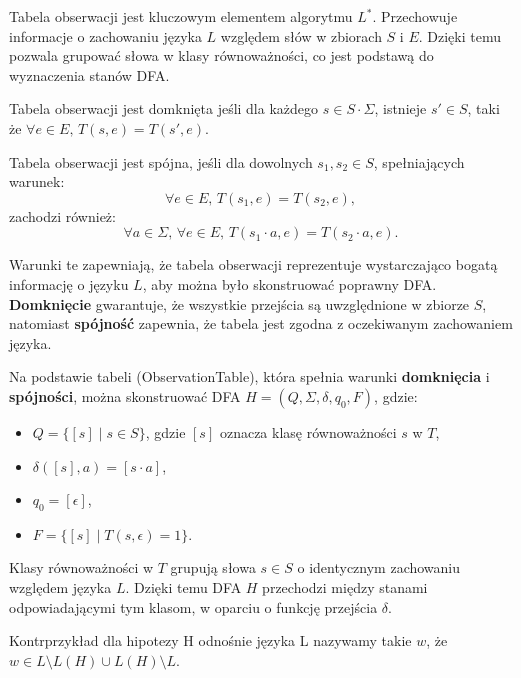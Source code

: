 Tabela obserwacji jest kluczowym elementem algorytmu \( L^* \). Przechowuje informacje o zachowaniu języka \( L \) względem słów w zbiorach \( S \) i \( E \). Dzięki temu pozwala grupować słowa w klasy równoważności, co jest podstawą do wyznaczenia stanów DFA.

\begin{definition}[Domknięcie] 
    Tabela obserwacji jest domknięta jeśli dla każdego \( s \in S \cdot \Sigma \), istnieje \( s' \in S \), taki że \( \forall e \in E, \, T(s, e) = T(s', e) \).
\end{definition}
\begin{definition}[Spójność]
    Tabela obserwacji jest spójna, jeśli dla dowolnych \( s_1, s_2 \in S \), spełniających warunek:
    \[
    \forall e \in E, \, T(s_1, e) = T(s_2, e),
    \]
    zachodzi również:
    \[
    \forall a \in \Sigma, \, \forall e \in E, \, T(s_1 \cdot a, e) = T(s_2 \cdot a, e).
    \]
\end{definition}

Warunki te zapewniają, że tabela obserwacji reprezentuje wystarczająco bogatą informację o języku \( L \), aby można było skonstruować poprawny DFA. \textbf{Domknięcie} gwarantuje, że wszystkie przejścia są uwzględnione w zbiorze \( S \), natomiast \textbf{spójność} zapewnia, że tabela jest zgodna z oczekiwanym zachowaniem języka.

\begin{definition}
    Na podstawie tabeli (ObservationTable), która spełnia warunki \textbf{domknięcia} i \textbf{spójności}, można skonstruować DFA \( H = (Q, \Sigma, \delta, q_0, F) \), gdzie:
    \begin{itemize}
        \item \( Q = \{[s] \mid s \in S\} \), gdzie \( [s] \) oznacza klasę równoważności \( s \) w \( T \),
        \item \( \delta([s], a) = [s \cdot a] \),
        \item \( q_0 = [\epsilon] \),
        \item \( F = \{[s] \mid T(s, \epsilon) = 1\} \).
    \end{itemize}
\end{definition}

Klasy równoważności w \( T \) grupują słowa \( s \in S \) o identycznym zachowaniu względem języka \( L \). Dzięki temu DFA \( H \) przechodzi między stanami odpowiadającymi tym klasom, w oparciu o funkcję przejścia \( \delta \).

\begin{definition}[Kontrprzykład]
    Kontrprzykład dla hipotezy H odnośnie języka L nazywamy takie $w$, że \( w \in L \setminus L(H) \cup L(H) \setminus L \).
\end{definition}

